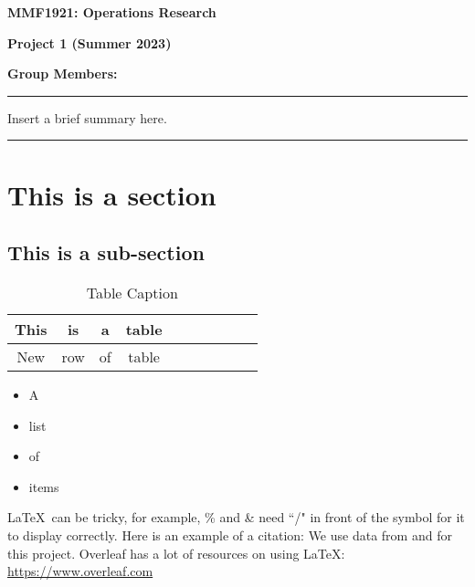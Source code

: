 \documentclass[10pt]{article}
\begin{document}
{\centering \textbf{\Large{MMF1921: Operations Research}} \par\vspace*{0.15cm}
\textbf{\large{Project 1 (Summer 2023)}}\par\vspace*{0.15cm}
\textbf{Group Members: \centering}\par 
}
\vspace*{0.2cm}
\hrule
\vspace*{0.2cm}

Insert a brief summary here.
\vspace*{0.1cm}
\hrule
\vspace*{0.1cm}

\section{This is a section}

\subsection{This is a sub-section}


\begin{table}[!htbp]
\footnotesize
\caption{Table Caption}
\centering
\begin{tabular}{c c c c c c c c c c}
\hline 
\rule{0pt}{3.5ex}This & is & a & table \\[1.5ex]
\hline\hline
\rule{0pt}{3.5ex}New & row & of & table \\[1.5ex]
\hline 
\end{tabular}
\label{tab:example}
\end{table}

\begin{itemize}
\itemsep -0.1em
    \item A
    \item list
    \item of
    \item items
\end{itemize}

\noindent \LaTeX \ can be tricky, for example, \% and \& need ``/" in front of the symbol for it to display correctly. Here is an example of a citation: We use data from \cite{French2016Data} and \cite{QuandlWIKI} for this project.
\newline
Overleaf has a lot of resources on using \LaTeX: \url{https://www.overleaf.com}

\printbibliography
\end{document}
